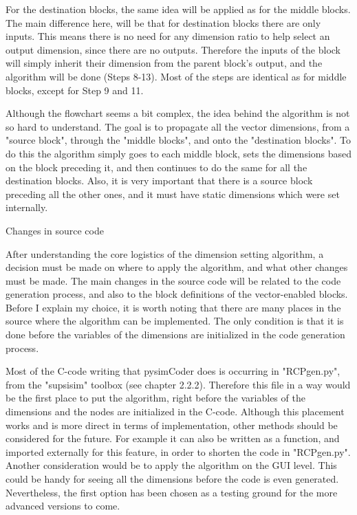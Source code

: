 \quad For the destination blocks, the same idea will be applied as for the middle blocks. The main difference
here, will be that for destination blocks there are only inputs. This means there is no need for any dimension
ratio to help select an output dimension, since there are no outputs. Therefore the inputs of the block will
simply inherit their dimension from the parent block's output, and the algorithm will be done (Steps 8-13).
Most of the steps are identical as for middle blocks, except for Step 9 and 11.

\quad Although the flowchart seems a bit complex, the idea behind the algorithm is not so hard to understand.
The goal is to propagate all the vector dimensions, from a "source block", through the "middle blocks", and
onto the "destination blocks". To do this the algorithm simply goes to each middle block, sets the dimensions
based on the block preceding it, and then continues to do the same for all the destination blocks. Also, it is
very important that there is a source block preceding all the other ones, and it must have static dimensions
which were set internally.


\secc Changes in source code

\qquad After understanding the core logistics of the dimension setting algorithm, a decision must be made on
where to apply the algorithm, and what other changes must be made. The main changes in the source code will
be related to the code generation process, and also to the block definitions of the vector-enabled blocks.
Before I explain my choice, it is worth noting that there are many places in the source where the algorithm
can be implemented. The only condition is that it is done before the variables of the dimensions are
initialized in the code generation process.

\quad Most of the C-code writing that pysimCoder does is occurring in "RCPgen.py", from the "supsisim"
toolbox (see chapter 2.2.2). Therefore this file in a way would be the first place to put the algorithm,
right before the variables of the dimensions and the nodes are initialized in the C-code. Although
this placement works and is more direct in terms of implementation, other methods should be considered for
the future. For example it can also be written as a function, and imported externally for this feature, in
order to shorten the code in "RCPgen.py". Another consideration would be to apply the algorithm on the GUI
level. This could be handy for seeing all the dimensions before the code is even generated.  Nevertheless,
the first option has been chosen as a testing ground for the more advanced versions to come.


